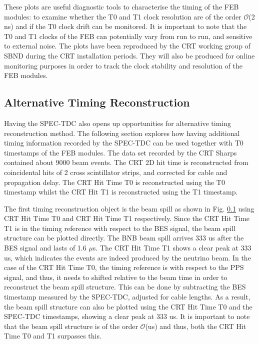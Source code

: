 These plots are useful diagnostic tools to characterise the timing of the FEB modules: to examine whether the T0 and T1 clock resolution are of the order $\mathcal{O}$(2 ns) and if the T0 clock drift can be monitored.
It is important to note that the T0 and T1 clocks of the FEB can potentially vary from run to run, and sensitive to external noise. 
The plots have been reproduced by the CRT working group of SBND during the CRT installation periods.
They will also be produced for online monitoring purposes in order to track the clock stability and resolution of the FEB modules.

\subsection{Alternative Timing Reconstruction}

Having the SPEC-TDC also opens up opportunities for alternative timing reconstruction method. 
The following section explores how having additional timing information recorded by the SPEC-TDC can be used together with T0 timestamps of the FEB modules.
The data set recorded by the CRT Sharps contained about 9000 beam events. 
The CRT 2D hit time is reconstructed from coincidental hits of 2 cross scintillator strips, and corrected for cable and propagation delay.
The CRT Hit Time T0 is reconstructed using the T0 timestamp whilst the CRT Hit T1 is reconstructed using the T1 timestamp. 

The first timing reconstruction object is the beam spill as shown in Fig. \ref{} using CRT Hit Time T0 and CRT Hit Time T1 respectively.
Since the CRT Hit Time T1 is in the timing reference with respect to the BES signal, the beam spill structure can be plotted directly.
The BNB beam spill arrives 333 us after the BES signal and lasts of 1.6 $\mu$s.
The CRT Hit Time T1 shows a clear peak at 333 us, which indicates the events are indeed produced by the neutrino beam.
In the case of the CRT Hit Time T0, the timing reference is with respect to the PPS signal, and thus, it needs to shifted relative to the beam time in order to reconstruct the beam spill structure.
This can be done by subtracting the BES timestamp measured by the SPEC-TDC, adjusted for cable lengths.
As a result, the beam spill structure can also be plotted using the CRT Hit Time T0 and the SPEC-TDC timestamps, showing a clear peak at 333 us.
It is important to note that the beam spill structure is of the order $\mathcal{O}$(us) and thus, both the CRT Hit Time T0 and T1 surpasses this.

